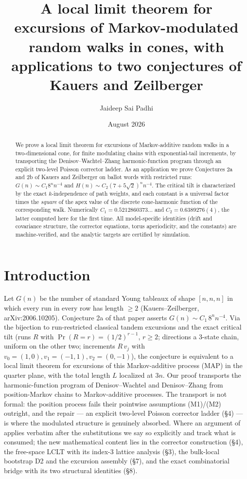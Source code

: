 \documentclass[11pt]{article}
\title{A local limit theorem for excursions of Markov-modulated random walks in cones, with applications to two conjectures of Kauers and Zeilberger}
\author{Jaideep Sai Padhi}
\date{August 2026}
\begin{document}
\maketitle
\begin{abstract}
We prove a local limit theorem for excursions of Markov-additive random walks in a
two-dimensional cone, for finite modulating chains with exponential-tail increments, by
transporting the Denisov--Wachtel--Zhang harmonic-function program through an explicit
two-level Poisson corrector ladder. As an application we prove Conjectures 2a and 2b of
Kauers and Zeilberger on ballot words with restricted runs: $G(n)\sim C_1 8^n n^{-4}$ and
$H(n)\sim C_2(7+5\sqrt2)^n n^{-4}$. The critical tilt is characterized by the exact
$k$-independence of path weights, and each constant is a universal factor times the
\emph{square} of the apex value of the discrete cone-harmonic function of the
corresponding walk. Numerically $C_1=0.5212860373\ldots$ and $C_2=0.6389276(4)$, the
latter computed here for the first time. All model-specific identities (drift and
covariance structure, the corrector equations, torus aperiodicity, and the constants) are
machine-verified, and the analytic targets are certified by simulation.
\end{abstract}

\section{Introduction}
Let $G(n)$ be the number of standard Young tableaux of shape $[n,n,n]$ in which every run
in every row has length $\ge2$ (Kauers--Zeilberger, arXiv:2006.10205). Conjecture 2a of that
paper asserts $G(n)\sim C_1\,8^n n^{-4}$. Via the bijection to run-restricted classical
tandem excursions and the exact critical tilt (runs $R$ with $\Pr(R=r)=(1/2)^{r-1}$, $r\ge2$;
directions a 3-state chain, uniform on the other two; increments $R\,v_j$ with
$v_0=(1,0),v_1=(-1,1),v_2=(0,-1)$), the conjecture is equivalent to a local limit theorem
for excursions of this Markov-additive process (MAP) in the quarter plane, with the total
length $L$ localized at $3n$. Our proof transports the harmonic-function program of Denisov--Wachtel \cite{DW} and
Denisov--Zhang \cite{DZ} from position-Markov chains to Markov-additive processes. The
transport is not formal: the position process fails their pointwise assumptions
(M1)/(M2) outright, and the repair --- an explicit two-level Poisson corrector ladder
(\S4) --- is where the modulated structure is genuinely absorbed. Where an argument of
\cite{DZ} applies verbatim after the substitutions we say so explicitly and track what is
consumed; the new mathematical content lies in the corrector construction (\S4), the
free-space LCLT with its index-3 lattice analysis (\S3), the bulk-local bootstrap D2 and
the excursion assembly (\S7), and the exact combinatorial bridge with its two structural
identities (\S8).
\end{document}
